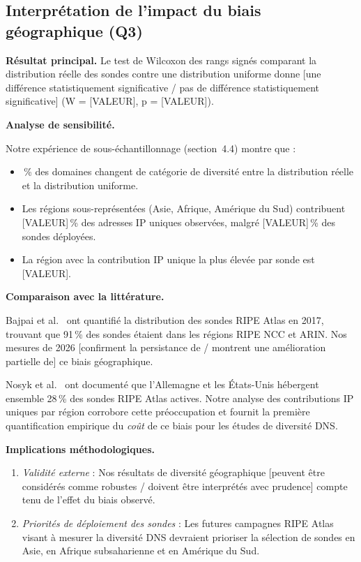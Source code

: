 \subsection{Interprétation de l'impact du biais géographique (Q3)}
\label{subsec:5.1.3}

\textbf{Résultat principal.} Le test de Wilcoxon des rangs signés comparant la distribution réelle des sondes contre une distribution uniforme donne [une différence statistiquement significative / pas de différence statistiquement significative] (W = [VALEUR], p = [VALEUR]).

\textbf{Analyse de sensibilité.}

Notre expérience de sous-échantillonnage (section~4.4) montre que :
\begin{itemize}
  \item [VALEUR]\,\% des domaines changent de catégorie de diversité entre la distribution réelle et la distribution uniforme.
  \item Les régions sous-représentées (Asie, Afrique, Amérique du Sud) contribuent [VALEUR]\,\% des adresses IP uniques observées, malgré [VALEUR]\,\% des sondes déployées.
  \item La région avec la contribution IP unique la plus élevée par sonde est [VALEUR].
\end{itemize}

\textbf{Comparaison avec la littérature.}

Bajpai et al.~\cite{Bajpai2017} ont quantifié la distribution des sondes RIPE Atlas en 2017, trouvant que 91\,\% des sondes étaient dans les régions RIPE NCC et ARIN. Nos mesures de 2026 [confirment la persistance de / montrent une amélioration partielle de] ce biais géographique.

Nosyk et al.~\cite{Nosyk2024} ont documenté que l'Allemagne et les États-Unis hébergent ensemble 28\,\% des sondes RIPE Atlas actives. Notre analyse des contributions IP uniques par région corrobore cette préoccupation et fournit la première quantification empirique du \textit{coût} de ce biais pour les études de diversité DNS.

\textbf{Implications méthodologiques.}

\begin{enumerate}
  \item \textit{Validité externe} : Nos résultats de diversité géographique [peuvent être considérés comme robustes / doivent être interprétés avec prudence] compte tenu de l'effet du biais observé.
  \item \textit{Priorités de déploiement des sondes} : Les futures campagnes RIPE Atlas visant à mesurer la diversité DNS devraient prioriser la sélection de sondes en Asie, en Afrique subsaharienne et en Amérique du Sud.
\end{enumerate}
\bigskip
